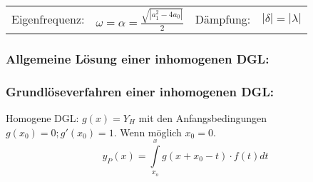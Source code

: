 \begin{tabular}{p{2cm}p{5cm}p{2cm}p{4cm}}
	Eigenfrequenz: & $\omega = \alpha = \frac{\sqrt{|a_1^2 - 4a_0|}}{2}$ &
	Dämpfung: &  $|\delta| = |\lambda|$\\
\end{tabular}

\subsubsection{Allgemeine Lösung einer inhomogenen DGL:\quad{}}

\subsubsection{Grundlöseverfahren einer inhomogenen DGL:\quad{}}
Homogene DGL: $g(x) = Y_H$ mit den Anfangsbedingungen $g(x_0) = 0; g'(x_0) = 1$. Wenn möglich $x_0 = 0$.\\
$$y_P(x)=\int\limits_{x_o}^{x} g(x+x_0-t)\cdot f(t)dt$$	

